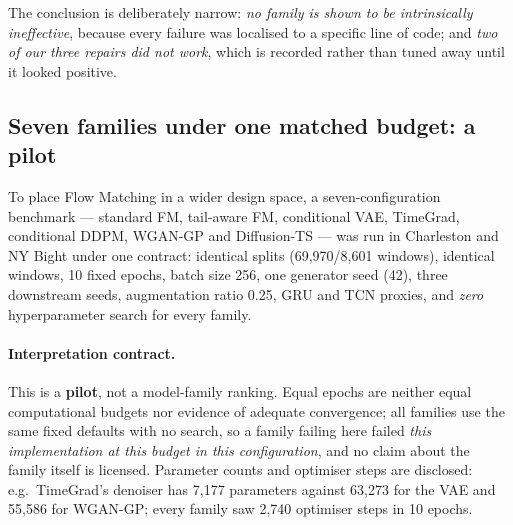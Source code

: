 The conclusion is deliberately narrow: \emph{no family is shown to be
intrinsically ineffective}, because every failure was localised to a specific
line of code; and \emph{two of our three repairs did not work}, which is
recorded rather than tuned away until it looked positive.

\subsection{Seven families under one matched budget: a pilot}
\label{sec:results-benchmark-pilot}

To place Flow Matching in a wider design space, a seven-configuration
benchmark —
standard FM, tail-aware FM, conditional VAE, TimeGrad, conditional DDPM,
WGAN-GP and Diffusion-TS — was run in Charleston and NY Bight under one
contract: identical splits (69{,}970/8{,}601 windows), identical windows,
10 fixed epochs, batch size 256, one generator seed (42), three downstream
seeds, augmentation ratio 0.25, GRU and TCN proxies, and \emph{zero}
hyperparameter search for every family.

\paragraph{Interpretation contract.} This is a \textbf{pilot}, not a
model-family ranking. Equal epochs are neither equal computational budgets nor
evidence of adequate convergence; all families use the same fixed defaults with
no search, so a family failing here failed \emph{this implementation at this
budget in this configuration}, and no claim about the family itself is
licensed. Parameter counts and optimiser steps are disclosed: e.g.\ TimeGrad's
denoiser has 7{,}177 parameters against 63{,}273 for the VAE and 55{,}586 for
WGAN-GP; every family saw 2{,}740 optimiser steps in 10 epochs.

